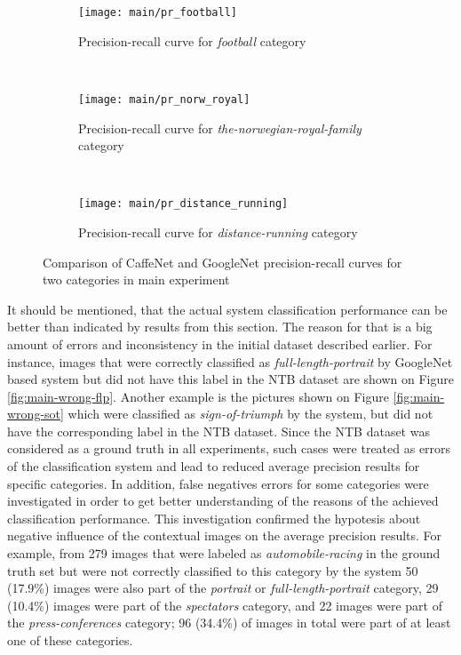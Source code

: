     \begin{figure}[h!]
        \centering
        \begin{subfigure}[a]{0.8\textwidth}
            \texttt{[image: main/pr\_football]}
            \caption{Precision-recall curve for \textit{football} category}
            \label{fig:main-pr-football}
        \end{subfigure}
        \\
        \begin{subfigure}[a]{0.8\textwidth}
            \texttt{[image: main/pr\_norw\_royal]}
            \caption{Precision-recall curve for \textit{the-norwegian-royal-family} category}
            \label{fig:main-pr-royal}
        \end{subfigure}
        \\
        \begin{subfigure}[a]{0.8\textwidth}
            \texttt{[image: main/pr\_distance\_running]}
            \caption{Precision-recall curve for \textit{distance-running} category}
            \label{fig:main-pr-distance-running}
        \end{subfigure}
        \caption[Main experiment. Precision-recall curves CaffeNet vs GoogleNet]{Comparison of CaffeNet and GoogleNet precision-recall curves for two categories in main experiment}
        \label{main-pr}
    \end{figure}
    
    It should be mentioned, that the actual system classification performance can be better than indicated by results from this section. The reason for that is a big amount of errors and inconsistency in the initial dataset described earlier. For instance, images that were correctly classified as \textit{full-length-portrait} by GoogleNet based system but did not have this label in the NTB dataset are shown on Figure \ref{fig:main-wrong-flp}. Another example is the pictures shown on Figure \ref{fig:main-wrong-sot} which were classified as \textit{sign-of-triumph} by the system, but did not have the corresponding label in the NTB dataset. Since the NTB dataset was considered as a ground truth in all experiments, such cases were treated as errors of the classification system and lead to reduced average precision results for specific categories. In addition, false negatives errors for some categories were investigated in order to get better understanding of the reasons of the achieved classification performance. This investigation confirmed the hypotesis about negative influence of the contextual images on the average precision results. For example, from 279 images that were labeled as \textit{automobile-racing} in the ground truth set but were not correctly classified to this category by the system 50 (17.9\%) images were also part of the \textit{portrait} or \textit{full-length-portrait} category, 29 (10.4\%) images were part of the \textit{spectators} category, and 22 images were part of the \textit{press-conferences} category; 96 (34.4\%) of images in total were part of at least one of these categories.
    
